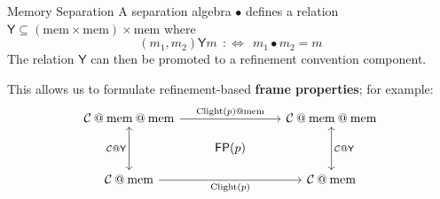 \documentclass[aspectratio=1610,mathserif]{beamer}
\newcommand{\kw}[1]{\ensuremath{ \mathrm{#1} }}
\newcommand{\lensarrow}{\leftrightarrows}
\begin{document}
%
%

\begin{frame}[fragile]{Memory Separation} %
  A separation algebra $\bullet$ defines a relation
  $\mathsf{Y} \subseteq (\kw{mem} \times \kw{mem}) \times \kw{mem}$
  where
  \[
    (m_1, m_2) \mathrel{\mathsf{Y}} m \:\: :\Leftrightarrow \:\:
    m_1 \bullet m_2 = m
  \]
  The relation $\mathsf{Y}$ can then be promoted
  to a refinement convention component.

  \pause \vfill
  This allows us to formulate refinement-based \textbf{frame properties};
  for example:
  \[
    \begin{tikzcd}[row sep=small]
      \mathcal{C} \mathbin@ \kw{mem} \mathbin@ \kw{mem}
        \ar[rr, "\kw{Clight}(p) \mathbin@ \kw{mem}"]
        \ar[dd, "\mathcal{C} \mathbin@ \mathsf{Y}"', leftrightarrow] &&
      \mathcal{C} \mathbin@ \kw{mem} \mathbin@ \kw{mem}
        \ar[dd, "\mathcal{C} \mathbin@ \mathsf{Y}", leftrightarrow]
      \\
      & \mathsf{FP}(p) &
      \\
      \mathcal{C} \mathbin@ \kw{mem}
        \ar[rr, "\kw{Clight}(p)"'] &&
      \mathcal{C} \mathbin@ \kw{mem}
    \end{tikzcd}
  \]
\end{frame}
\end{document}
